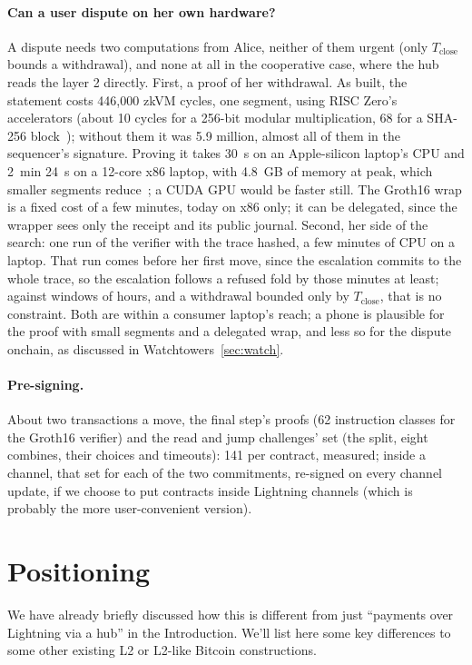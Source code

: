\documentclass[11pt]{article}
\newcommand{\Tc}{T_{\mathrm{close}}}
\begin{document}
\paragraph{Can a user dispute on her own hardware?} A dispute needs
two computations from Alice, neither of them urgent (only $\Tc$ bounds
a withdrawal), and none at all in the cooperative case, where the hub
reads the layer 2 directly. First, a proof of her withdrawal. As built,
the statement costs 446,000 zkVM cycles, one segment, using RISC Zero's
accelerators (about 10 cycles for a 256-bit modular multiplication, 68
for a SHA-256 block~\cite{risc0accel}); without them it was 5.9
million, almost all of them in the sequencer's signature. Proving it
takes 30~s on an Apple-silicon laptop's CPU and 2~min 24~s on a
12-core x86 laptop, with 4.8~GB of memory at peak, which smaller
segments reduce~\cite{risc0data}; a CUDA GPU would be faster still. The Groth16 wrap is a fixed cost of a few minutes, today on x86
only; it can be delegated, since the wrapper sees only the receipt and
its public journal. Second, her side of the search: one run of the
verifier with the trace hashed, a few minutes of CPU on a laptop. That
run comes before her first move, since the escalation commits to the
whole trace, so the escalation follows a refused fold by those minutes
at least; against windows of hours, and a withdrawal bounded only by
$\Tc$, that is no constraint. Both
are within a consumer laptop's reach; a phone is plausible for the
proof with small segments and a delegated wrap, and less so for the
dispute onchain, as discussed in Watchtowers~\ref{sec:watch}.

\paragraph{Pre-signing.} About two transactions a move, the final
step's proofs (62 instruction classes for the Groth16 verifier) and the
read and jump challenges' set (the split, eight combines, their choices
and timeouts): 141 per contract, measured; inside a channel, that set
for each of the two commitments, re-signed on every channel update, if we choose to put contracts inside Lightning channels (which is probably the more user-convenient version).

\section{Positioning}
\label{sec:positioning}

We have already briefly discussed how this is different from just ``payments over Lightning via a hub'' in the Introduction. We'll list here some key differences to some other existing L2 or L2-like Bitcoin constructions.
\end{document}
